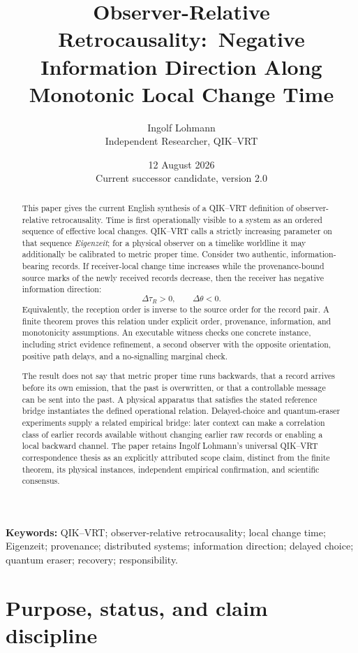\documentclass[11pt]{article}
\title{Observer-Relative Retrocausality:\
\large Negative Information Direction Along Monotonic Local Change Time}
\author{Ingolf Lohmann\\
Independent Researcher, QIK--VRT}
\date{12 August 2026\\Current successor candidate, version 2.0}
\theoremstyle{remark}
\begin{document}
\maketitle

\begin{abstract}
This paper gives the current English synthesis of a QIK--VRT definition of
observer-relative retrocausality.  Time is first operationally visible to a
system as an ordered sequence of effective local changes.  QIK--VRT calls a
strictly increasing parameter on that sequence \emph{Eigenzeit}; for a
physical observer on a timelike worldline it may additionally be calibrated
to metric proper time.  Consider two authentic, information-bearing records.
If receiver-local change time increases while the provenance-bound source
marks of the newly received records decrease, then the receiver has negative
information direction:
\[
  \Delta\tau_R>0,\qquad \Delta\theta<0.
\]
Equivalently, the reception order is inverse to the source order for the
record pair.  A finite theorem proves this relation under explicit order,
provenance, information, and monotonicity assumptions.  An executable witness
checks one concrete instance, including strict evidence refinement, a second
observer with the opposite orientation, positive path delays, and a
no-signalling marginal check.

The result does not say that metric proper time runs backwards, that a record
arrives before its own emission, that the past is overwritten, or that a
controllable message can be sent into the past.  A physical apparatus that
satisfies the stated reference bridge instantiates the defined operational
relation.  Delayed-choice and quantum-eraser experiments supply a related
empirical bridge: later context can make a correlation class of earlier
records available without changing earlier raw records or enabling a local
backward channel.  The paper retains Ingolf Lohmann's universal QIK--VRT
correspondence thesis as an explicitly attributed scope claim, distinct from
the finite theorem, its physical instances, independent empirical
confirmation, and scientific consensus.
\end{abstract}

\noindent\textbf{Keywords:} QIK--VRT; observer-relative retrocausality;
local change time; Eigenzeit; provenance; distributed systems; information
direction; delayed choice; quantum eraser; recovery; responsibility.

\section{Purpose, status, and claim discipline}
\label{sec:purpose}
\end{document}
